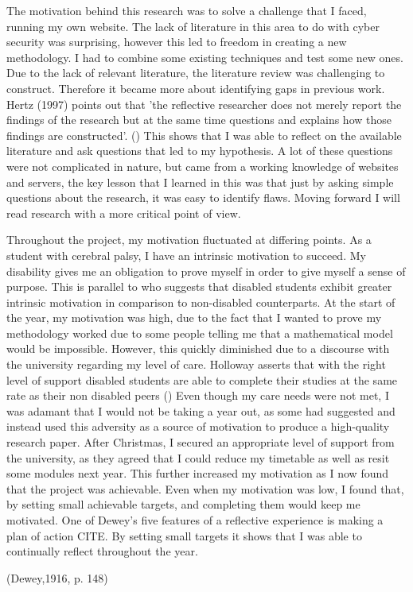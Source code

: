 

The motivation behind this research was to solve a challenge that I faced, running my own website. The lack of literature in this area to do with cyber security was surprising, however this led to freedom in creating a new methodology. I had to combine some existing techniques and test some new ones. Due to the lack of relevant literature, the literature review was challenging to construct. Therefore it became more about identifying gaps in previous work. Hertz (1997) points out that 'the reflective researcher does not merely report the findings of the research but at the same time questions and explains how those findings are constructed'. (\cite{hertz1996introduction}) This shows that I was able to reflect on the available literature and ask questions that led to my hypothesis. A lot of these questions were not complicated in nature, but came from a working knowledge of websites and servers, the key lesson that I learned in this was that just by asking simple questions about the research, it was easy to identify flaws. Moving forward I will read research with a more critical point of view.

Throughout the project, my motivation fluctuated at differing points. As a student with cerebral palsy, I have an intrinsic motivation to succeed. My disability gives  me an obligation to prove myself in order to give myself a sense of purpose. This is parallel to \cite{bye2007motivation} who suggests that disabled students exhibit greater intrinsic motivation in comparison to non-disabled counterparts. At the start of the year, my motivation was high, due to the fact that I wanted to prove my methodology worked due to some people telling me that a mathematical model would be impossible. However, this quickly diminished due to a discourse with the university regarding my level of care. Holloway asserts that with the right level of support disabled students are able to complete their studies at the same rate as their non disabled peers (\cite{holloway2001experience}) Even though my care needs were not met, I was adamant that I would not be taking a year out, as some had suggested and instead used this adversity as a source of motivation to produce a high-quality research paper. After Christmas, I secured an appropriate level of support from the university, as they agreed that I could reduce my timetable as well as resit some modules next year. This further increased my motivation as I now found that the project was achievable. Even when my motivation was low, I found that, by setting small achievable targets, and completing them would keep me motivated. One of Dewey's five features of a reflective experience is making a plan of action CITE. By setting small targets it shows that I was able to continually reflect throughout the year.



(Dewey,1916, p. 148) 